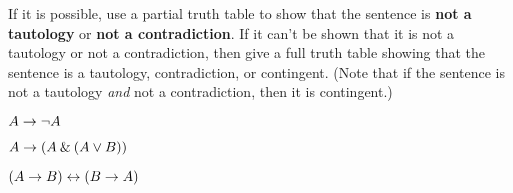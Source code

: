 \problempart
\label{pr.TT.TTorC3}
If it is possible, use a partial truth table to show that the sentence is \textbf{not a tautology} or \textbf{not a contradiction}. If it can't be shown that it is not a tautology or not a contradiction, then give a full truth table showing that the sentence is a tautology, contradiction, or contingent. (Note that if the sentence is not a tautology \textit{and} not a contradiction, then it is contingent.) 


\begin{earg}
\item  $A \rightarrow {\neg} A$ \vspace{.5ex}							

%
\item $A \rightarrow (A \mathbin{\&} (A \vee B))$ \vspace{.5ex}	

%

\item $(A \rightarrow B) \leftrightarrow (B \rightarrow A)$ 	\vspace{.5ex}				%
%
%
%


\end{earg}
